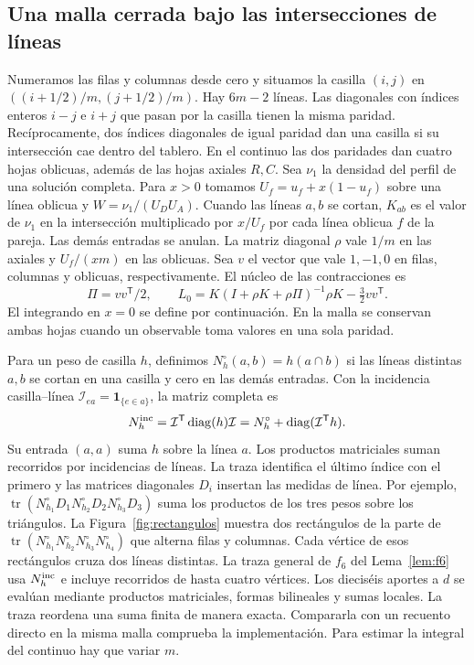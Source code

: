 \subsection{Una malla cerrada bajo las intersecciones de líneas}
Numeramos las filas y columnas desde cero y situamos la casilla $(i,j)$ en
$((i+1/2)/m,(j+1/2)/m)$. Hay $6m-2$ líneas. Las diagonales con índices enteros $i-j$ e $i+j$
que pasan por la casilla tienen la misma paridad. Recíprocamente, dos índices diagonales de igual
paridad dan una casilla si su intersección cae dentro del tablero. En el continuo las dos
paridades dan cuatro hojas oblicuas, además de las hojas axiales $R,C$. Sea $\nu_1$ la densidad
del perfil de una solución completa.
Para $x>0$ tomamos $U_f=u_f+x(1-u_f)$ sobre una línea oblicua y
$W=\nu_1/(U_DU_A)$. Cuando las líneas $a,b$ se cortan, $K_{ab}$ es el valor de $\nu_1$ en la
intersección multiplicado por $x/U_f$ por cada línea oblicua $f$ de la pareja. Las demás entradas se
anulan. La matriz diagonal $\rho$ vale $1/m$ en las axiales y $U_f/(xm)$ en las oblicuas. Sea $v$ el
vector que vale $1,-1,0$ en filas, columnas y oblicuas, respectivamente. El núcleo de las contracciones
es
\[
 \Pi=vv^{\mathsf T}/2,\qquad
 L_0=K(I+\rho K+\rho\Pi)^{-1}\rho K-\tfrac32vv^{\mathsf T}.
\]
El integrando en $x=0$ se define por continuación. En la malla se conservan ambas hojas cuando un
observable toma valores en una sola paridad.

Para un peso de casilla $h$, definimos $N_h^\circ(a,b)=h(a\cap b)$ si las líneas distintas
$a,b$ se cortan en una casilla y cero en las demás entradas. Con la incidencia casilla--línea
$\mathcal I_{ea}=\mathbf 1_{\{e\in a\}}$, la matriz completa es
\[
 N_h^{\rm inc}=\mathcal I^{\mathsf T}\operatorname{diag}(h)\mathcal I
              =N_h^\circ+\operatorname{diag}(\mathcal I^{\mathsf T}h).
\]
Su entrada $(a,a)$ suma $h$ sobre la línea $a$. Los productos matriciales suman recorridos por
incidencias de líneas. La traza identifica el último índice con el primero y las matrices diagonales
$D_i$ insertan las medidas de línea. Por ejemplo, $\operatorname{tr}(N_{h_1}^\circ D_1
N_{h_2}^\circ D_2 N_{h_3}^\circ D_3)$ suma los productos de los tres pesos sobre los triángulos.
La Figura~\ref{fig:rectangulos} muestra dos rectángulos de la parte de
$\operatorname{tr}(N_{h_1}^\circ N_{h_2}^\circ N_{h_3}^\circ N_{h_4}^\circ)$ que alterna filas y columnas.
Cada vértice de esos rectángulos cruza dos líneas distintas. La traza general de $f_6$ del
Lema~\ref{lem:f6} usa $N_h^{\rm inc}$ e incluye recorridos de hasta cuatro vértices.
Los dieciséis aportes a $d$ se evalúan mediante productos matriciales, formas bilineales y sumas
locales. La traza reordena una suma finita de manera exacta. Compararla con un recuento directo en
la misma malla comprueba la implementación. Para estimar la integral del continuo hay que variar $m$.



